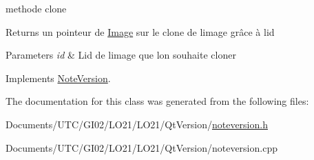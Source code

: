 methode clone 

\begin{DoxyReturn}{Returns}
un pointeur de \hyperlink{class_image}{Image} sur le clone de l\textquotesingle{}image grâce à l\textquotesingle{}id 
\end{DoxyReturn}

\begin{DoxyParams}{Parameters}
{\em id} & L\textquotesingle{}id de l\textquotesingle{}image que l\textquotesingle{}on souhaite cloner \\
\hline
\end{DoxyParams}


Implements \hyperlink{class_note_version_a7eb23a52291ec623b9bc1b6fe3e86c5a}{Note\+Version}.



The documentation for this class was generated from the following files\+:\begin{DoxyCompactItemize}
\item 
Documents/\+U\+T\+C/\+G\+I02/\+L\+O21/\+L\+O21/\+Qt\+Version/\hyperlink{noteversion_8h}{noteversion.\+h}\item 
Documents/\+U\+T\+C/\+G\+I02/\+L\+O21/\+L\+O21/\+Qt\+Version/noteversion.\+cpp\end{DoxyCompactItemize}
